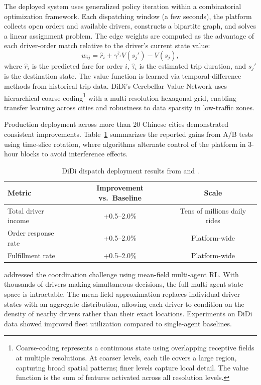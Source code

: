 The deployed system uses generalized policy iteration within a combinatorial optimization framework. Each dispatching window (a few seconds), the platform collects open orders and available drivers, constructs a bipartite graph, and solves a linear assignment problem. The edge weights are computed as the advantage of each driver-order match relative to the driver's current state value:
\begin{equation}
w_{ij} = \hat{r}_i + \gamma^{\hat{\tau}_i} V(s_j') - V(s_j),
\end{equation}
where $\hat{r}_i$ is the predicted fare for order $i$, $\hat{\tau}_i$ is the estimated trip duration, and $s_j'$ is the destination state. The value function is learned via temporal-difference methods from historical trip data. DiDi's Cerebellar Value Network \citep[CVNet;][]{Tang2019cvnet} uses hierarchical coarse-coding\footnote{Coarse-coding represents a continuous state using overlapping receptive fields at multiple resolutions. At coarser levels, each tile covers a large region, capturing broad spatial patterns; finer levels capture local detail. The value function is the sum of features activated across all resolution levels.} with a multi-resolution hexagonal grid, enabling transfer learning across cities and robustness to data sparsity in low-traffic zones.

Production deployment across more than 20 Chinese cities demonstrated consistent improvements. Table~\ref{tab:didi_results} summarizes the reported gains from A/B tests using time-slice rotation, where algorithms alternate control of the platform in 3-hour blocks to avoid interference effects.

\begin{table}[htbp]
\centering
\caption{DiDi dispatch deployment results from \citet{Qin2021dispatch} and \citet{Tang2019cvnet}.}
\label{tab:didi_results}
\begin{tabular}{lcc}
\toprule
Metric & Improvement vs.\ Baseline & Scale \\
\midrule
Total driver income & +0.5--2.0\% & Tens of millions daily rides \\
Order response rate & +0.5--2.0\% & Platform-wide \\
Fulfillment rate & +0.5--2.0\% & Platform-wide \\
\bottomrule
\end{tabular}
\end{table}

\citet{Li2019ridesharing} addressed the coordination challenge using mean-field multi-agent RL. With thousands of drivers making simultaneous decisions, the full multi-agent state space is intractable. The mean-field approximation replaces individual driver states with an aggregate distribution, allowing each driver to condition on the density of nearby drivers rather than their exact locations. Experiments on DiDi data showed improved fleet utilization compared to single-agent baselines.

